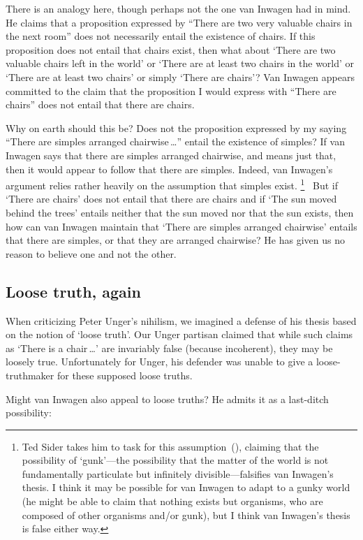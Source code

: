 \documentclass[11pt]{standalone}
\begin{document}
\begin{spacing}{1.5}
There is an analogy here, though perhaps not the one van Inwagen had
in mind.  He claims that a proposition expressed by ``There are two
very valuable chairs in the next room'' does not necessarily entail
the existence of chairs.  If this proposition does not entail that
chairs exist, then what about `There are two valuable chairs left in
the world' or `There are at least two chairs in the world' or `There
are at least two chairs' or simply `There are chairs'?  Van Inwagen
appears committed to the claim that the proposition I would express
with ``There are chairs'' does not entail that there are chairs.

Why on earth should this be? Does not the proposition expressed by my
saying ``There are simples arranged chairwise\,\ldots '' entail the
existence of simples?  If van Inwagen says that there are simples
arranged chairwise, and means just that, then it would appear to
follow that there are simples.  Indeed, van Inwagen's argument relies
rather heavily on the assumption that simples exist.
%
\footnote{Ted Sider takes him to task for this
  assumption~(\citeyear{sider1993}), claiming that the possibility of
  `gunk'---the possibility that the matter of the world is not
  fundamentally particulate but infinitely divisible---falsifies van
  Inwagen's thesis.  I think it may be possible for van Inwagen to
  adapt to a gunky world (he might be able to claim that nothing
  exists but organisms, who are composed of other organisms and/or
  gunk), but I think van Inwagen's thesis is false either way.}
%
\ But if `There are chairs' does not entail that there are chairs and
if `The sun moved behind the trees' entails neither that the sun moved
nor that the sun exists, then how can van Inwagen maintain that `There
are simples arranged chairwise' entails that there are simples, or
that they are arranged chairwise?  He has given us no reason to
believe one and not the other.

\subsection{Loose truth, again}
\label{loose-v}
When criticizing Peter Unger's nihilism, we imagined a defense of his
thesis based on the notion of `loose truth'.  Our Unger partisan
claimed that while such claims as `There is a chair\,\ldots ' are
invariably false (because incoherent), they may be loosely true.
Unfortunately for Unger, his defender was unable to give a
loose-truthmaker for these supposed loose truths.

Might van Inwagen also appeal to loose truths?  He admits it as a
last-ditch possibility:


\end{spacing}
\end{document}
